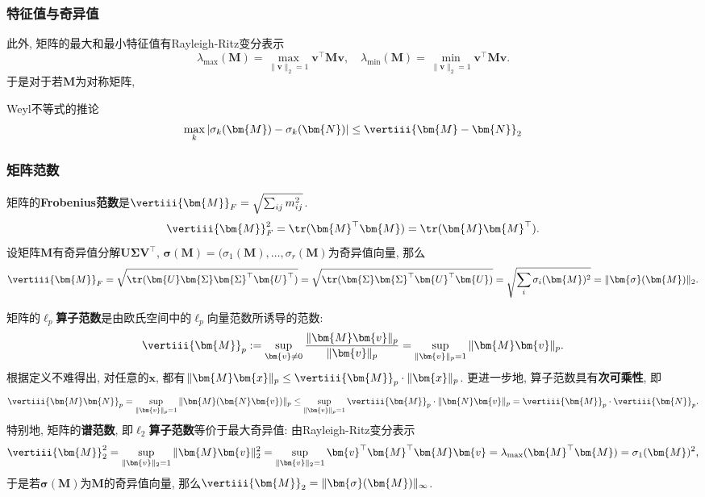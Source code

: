 \subsubsection{特征值与奇异值}

此外, 矩阵的最大和最小特征值有Rayleigh-Ritz变分表示
\begin{equation*}
	\lambda_{\max}(\bm{M}) = \max_{\|\bm{v}\|_2 = 1} \bm{v}^\top \bm{M} \bm{v}, \quad
	\lambda_{\min}(\bm{M}) = \min_{\|\bm{v}\|_2 = 1} \bm{v}^\top \bm{M} \bm{v}. 
\end{equation*}
于是对于若$\bm{M}$为对称矩阵, 

Weyl不等式的推论
\begin{equation}\label{eq:Weyl}
	\max_{k} \left|\sigma_k(\bm{M}) - \sigma_k(\bm{N})\right|
	\leq \vertiii{\bm{M} - \bm{N}}_2
\end{equation}

\subsubsection{矩阵范数}

矩阵的\textbf{Frobenius范数}是$\vertiii{\bm{M}}_F = \sqrt{\sum_{ij} m_{ij}^2}$. 
\begin{equation*}
	\vertiii{\bm{M}}_F^2 
	= \tr(\bm{M}^\top \bm{M})
	= \tr(\bm{M} \bm{M}^\top). 
\end{equation*}
设矩阵$\bm{M}$有奇异值分解$\bm{U}\bm{\Sigma}\bm{V}^\top$, $\bm{\sigma}(\bm{M}) = (\sigma_1(\bm{M}), \dots, \sigma_r(\bm{M})$为奇异值向量, 那么
\begin{equation*}
	\vertiii{\bm{M}}_F 
	= \sqrt{\tr(\bm{U} \bm{\Sigma} \bm{\Sigma}^\top \bm{U}^\top)}
	= \sqrt{\tr(\bm{\Sigma} \bm{\Sigma}^\top \bm{U}^\top \bm{U})}
	= \sqrt{\sum_i \sigma_i(\bm{M})^2}
	= \|\bm{\sigma}(\bm{M})\|_2. 
\end{equation*}


矩阵的$\ell_p$\textbf{算子范数}是由欧氏空间中的$\ell_p$向量范数所诱导的范数:
\begin{equation*}
	\vertiii{\bm{M}}_p
	:= \sup_{\bm{v} \neq 0} \frac{\|\bm{M} \bm{v}\|_p}{\|\bm{v}\|_p}
	= \sup_{\|\bm{v}\|_p = 1} \|\bm{M} \bm{v}\|_p. 
\end{equation*}
根据定义不难得出, 对任意的$\bm{x}$, 都有$\|\bm{M} \bm{x}\|_p \leq \vertiii{\bm{M}}_p \cdot \|\bm{x}\|_p$. 
更进一步地, 算子范数具有\textbf{次可乘性}, 即
\begin{equation*}
	\vertiii{\bm{M} \bm{N}}_p
	= \sup_{\|\bm{v}\|_p = 1} \|\bm{M} (\bm{N} \bm{v})\|_p
	\leq \sup_{\|\bm{v}\|_p = 1} \vertiii{\bm{M}}_p \cdot \|\bm{N} \bm{v}\|_p
	= \vertiii{\bm{M}}_p \cdot \vertiii{\bm{N}}_p. 
\end{equation*}
特别地, 矩阵的\textbf{谱范数}, 即\textbf{$\ell_2$算子范数}等价于最大奇异值: 由Rayleigh-Ritz变分表示
\begin{equation*}
	\vertiii{\bm{M}}_2^2 
	= \sup_{\|\bm{v}\|_2 = 1} \|\bm{M} \bm{v}\|_2^2
	= \sup_{\|\bm{v}\|_2 = 1} \bm{v}^\top \bm{M}^\top \bm{M} \bm{v}
	= \lambda_{\max}(\bm{M}^\top \bm{M})
	= \sigma_1(\bm{M})^2, 
\end{equation*}
于是若$\bm{\sigma}(\bm{M})$为$\bm{M}$的奇异值向量, 那么$\vertiii{\bm{M}}_2 = \|\bm{\sigma}(\bm{M})\|_{\infty}$. 

